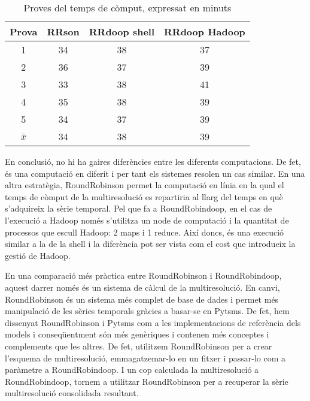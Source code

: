 \begin{table}[tp]
  \centering
  \begin{tabular}[tp]{c|ccc}
    Prova & RRson & RRdoop shell & RRdoop Hadoop \\\hline
    1 & 34 & 38 & 37 \\
    2 & 36 & 37 & 39 \\
    3 & 33 & 38 & 41 \\
    4 & 35 & 38 & 39 \\
    5 & 34 & 37 & 39   \\\hline
    $\bar{x}$ & 34   & 38   & 39   
  \end{tabular}

  \caption{Proves del temps de còmput, expressat en minuts}
  \label{tab:exemple:temps}
\end{table}






En conclusió, no hi ha gaires diferències entre les diferents
computacions. De fet, és una computació en diferit i per tant els
sistemes resolen un cas similar. En una altra estratègia,
RoundRobinson permet la computació en línia en la qual el temps de
còmput de la multiresolució es repartiria al llarg del temps en què
s'adquireix la sèrie temporal.  Pel que fa a RoundRobindoop, en el cas
de l'execució a Hadoop només s'utilitza un node de computació i la
quantitat de processos que escull Hadoop: 2 maps i 1 reduce. Així
doncs, és una execució similar a la de la shell i la diferència pot
ser vista com el cost que introdueix la gestió de Hadoop.




En una comparació més pràctica entre RoundRobinson i RoundRobindoop,
aquest darrer només és un sistema de càlcul de la multiresolució. En
canvi, RoundRobinson és un sistema més complet de base de dades i
permet més manipulació de les sèries temporals gràcies a basar-se en
Pytsms. De fet, hem dissenyat RoundRobinson i Pytsms com a les
implementacions de referència dels models i conseqüentment són més
genèriques i contenen més conceptes i complements que les altres.  De
fet, utilitzem RoundRobinson per a crear l'esquema de multiresolució,
emmagatzemar-lo en un fitxer i passar-lo com a paràmetre a
RoundRobindoop. I un cop calculada la multiresolució a RoundRobindoop,
tornem a utilitzar RoundRobinson per a recuperar la sèrie
multiresolució consolidada resultant.







